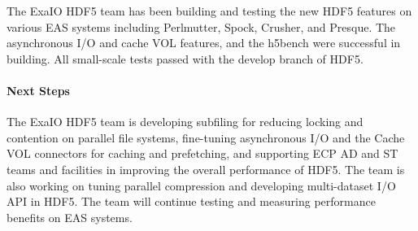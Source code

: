 
The ExaIO HDF5 team has been building and testing the new HDF5 features on various EAS systems including Perlmutter, Spock, Crusher, and Presque. The asynchronous I/O and cache VOL features, and the h5bench were successful in building. All small-scale tests passed with the develop branch of HDF5. 

\paragraph{Next Steps}

The ExaIO HDF5 team is developing subfiling for reducing locking and contention on parallel file systems,  fine-tuning asynchronous I/O and the Cache VOL connectors for caching and prefetching, and supporting ECP AD and ST teams and facilities in improving the overall performance of HDF5. The team is also working on tuning parallel compression and developing multi-dataset I/O API in HDF5. The team will continue testing and measuring performance benefits on EAS systems. 
